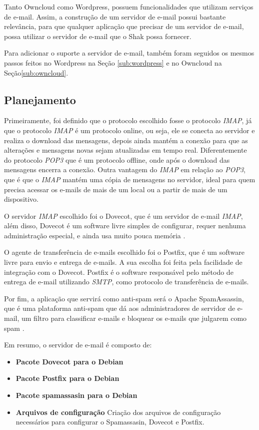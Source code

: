 Tanto Owncloud como Wordpress, possuem funcionalidades que utilizam serviços 
de e-mail. Assim, a construção de um servidor de e-mail 
possui bastante relevância, para que qualquer aplicação que precisar de um 
servidor de e-mail, possa utilizar o servidor de e-mail que o Shak possa fornecer.

Para adicionar o suporte a servidor de e-mail, também foram seguidos os mesmos passos
feitos no Wordpress na Seção \ref{sub:wordpress} e no Owncloud na Seção\ref{sub:owncloud}. 

\subsection{Planejamento}

Primeiramente, foi definido que o protocolo escolhido fosse o protocolo \textit{IMAP}, já
que o protocolo \textit{IMAP} é um protocolo online, ou seja, ele se conecta ao servidor
e realiza o download das mensagens, depois ainda  mantém a conexão para que
as alterações e mensagens novas sejam atualizadas em tempo real. Diferentemente do
protocolo \textit{POP3} que é um protocolo offline, onde após o download das mensagens encerra
a conexão. Outra vantagem do \textit{IMAP} em relação ao \textit{POP3}, que é que o 
\textit{IMAP} mantém uma cópia de mensagens no servidor, ideal para quem precisa 
acessar os e-mails de mais de um local ou a partir de mais de um dispositivo.

O servidor \textit{IMAP} escolhido foi o Dovecot, que é um servidor de e-mail
\textit{IMAP}, além disso, Dovecot é um software livre simples de configurar, requer nenhuma
administração especial, e ainda usa muito pouca memória \cite{dovecot}. 

O agente de transferência de e-mails escolhido foi o Postfix, que é um software
livre para envio e entrega de e-mails. A sua escolha foi feita pela facilidade de
integração com o Dovecot. Postfix é o software responsável pelo método de entrega de e-mail
utilizando \textit{SMTP}, como protocolo de transferência de e-mails. 

Por fim, a aplicação que servirá como anti-spam será o Apache SpamAssassin, que 
é uma plataforma anti-spam que dá aos administradores de servidor de e-mail, 
um filtro para classificar e-mails e bloquear os e-mails que julgarem como spam \cite{spam}. 

Em resumo, o servidor de e-mail é composto de:

\begin{itemize}
   \item \textbf{Pacote Dovecot para o Debian}
   \item \textbf{Pacote Postfix para o Debian}
   \item \textbf{Pacote spamassasin para o Debian}
   \item \textbf{Arquivos de configuração} Criação dos arquivos de configuração
   necessários para configurar o Spamassasin, Dovecot e Postfix.
\end{itemize}

